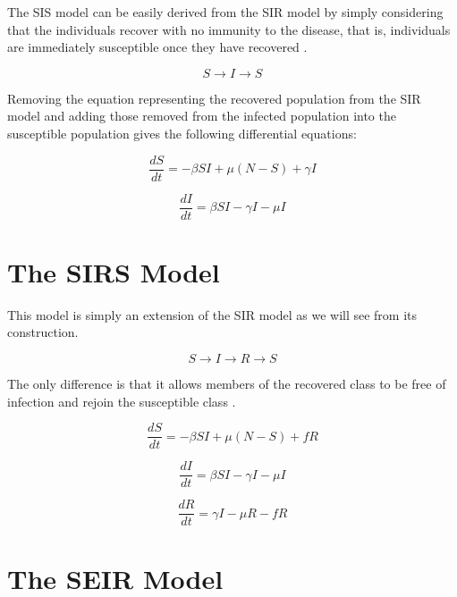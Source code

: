 The SIS model can be easily derived from the SIR model by simply considering that the individuals recover with no immunity to the disease, that is, individuals are immediately susceptible once they have recovered \cite{per14}.

\begin{equation}
S \rightarrow I \rightarrow S
\end{equation}

Removing the equation representing the recovered population from the SIR model and adding those removed from the infected population into the susceptible population gives the following differential equations:

\begin{equation}
\frac{dS}{dt} = -\beta S I + \mu(N - S) + \gamma I
\end{equation}

\begin{equation}
\frac{dI}{dt} = \beta S I - \gamma I - \mu I
\end{equation}

\section{The SIRS Model}

This model is simply an extension of the SIR model as we will see from its construction.

\begin{equation}
S \rightarrow I \rightarrow R \rightarrow S
\end{equation}

The only difference is that it allows members of the recovered class to be free of infection and rejoin the susceptible class \cite{per14}.

\begin{equation}
\frac{dS}{dt} = -\beta S I + \mu(N - S) + f R
\end{equation}

\begin{equation}
\frac{dI}{dt} = \beta S I - \gamma I - \mu I
\end{equation}

\begin{equation}
\frac{dR}{dt} = \gamma I - \mu R - f R
\end{equation}


\section{The SEIR Model}

